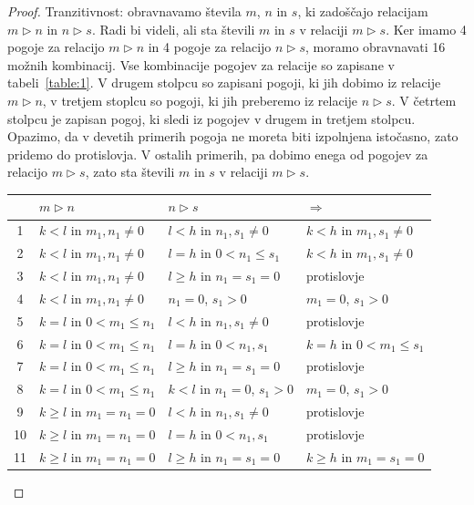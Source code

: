 \documentclass[mat2]{fmfdelo}
\begin{document}
\begin{proof}
Tranzitivnost: obravnavamo števila $m$,  $n$ in $s$, ki zadoščajo relacijam $m \triangleright n$ in $n \triangleright s$. Radi bi videli, ali sta števili $m$ in $s$ v relaciji $m \triangleright s$. Ker imamo 4 pogoje za relacijo $m \triangleright n$ in 4 pogoje za relacijo $n \triangleright s$, moramo obravnavati 16 možnih kombinacij. Vse kombinacije pogojev za relacije so zapisane v tabeli~\ref{table:1}. V drugem stolpcu so zapisani pogoji, ki jih dobimo iz relacije $m \triangleright n$, v tretjem stoplcu so pogoji, ki jih preberemo iz relacije $n \triangleright s$. V četrtem stolpcu je zapisan pogoj, ki sledi iz pogojev v drugem in tretjem stolpcu. Opazimo, da v devetih primerih pogoja ne moreta biti izpolnjena istočasno, zato pridemo do protislovja. V ostalih primerih, pa dobimo enega od pogojev za relacijo $m \triangleright s$, zato sta števili $m$ in $s$ v relaciji $m \triangleright s$.
\renewcommand{\arraystretch}{1.2}
\begin{table}[h!]
\centering
\begin{tabular}{||c | l | l | l||} 
 \hline
  & $m \triangleright n$ & $n \triangleright s$ & $\Rightarrow$ \\ [0.5ex] 
 \hline\hline
 1 & $k<l$ in $m_1, n_1 \neq 0$ & $l<h$ in $n_1, s_1 \neq 0$ & $k<h$ in $m_1, s_1 \neq 0$ \\ 
 2 & $k<l$ in $m_1, n_1 \neq 0$ & $l=h$ in $0<n_1 \leq s_1$ & $k<h$ in $m_1, s_1 \neq 0$ \\
 3 & $k<l$ in $m_1, n_1 \neq 0$ & $l \geq h$ in $n_1 = s_1 = 0$ & protislovje \\
 4 & $k<l$ in $m_1, n_1 \neq 0$ & $n_1 = 0$, $s_1 > 0$ & $m_1 = 0$, $s_1 > 0$ \\
 5 & $k=l$ in $0<m_1 \leq n_1$ & $l<h$ in $n_1, s_1 \neq 0$ & protislovje \\ 
 6 & $k=l$ in $0<m_1 \leq n_1$ & $l=h$ in $0<n_1, s_1$ & $k=h$ in $0<m_1 \leq s_1$ \\
 7 & $k=l$ in $0<m_1 \leq n_1$ & $l \geq h$ in $n_1 = s_1 = 0$ & protislovje \\
 8 & $k=l$ in $0<m_1 \leq n_1$ & $k<l$ in $n_1 = 0$, $s_1 > 0$ & $m_1 = 0$, $s_1 > 0$ \\
 9 & $k \geq l$ in $m_1 = n_1 = 0$ & $l<h$ in $n_1, s_1 \neq 0$ & protislovje \\ 
 10 & $k \geq l$ in $m_1 = n_1 = 0$ & $l=h$ in $0<n_1, s_1$ & protislovje \\
 11 & $k \geq l$ in $m_1 = n_1 = 0$ & $l \geq h$ in $n_1 = s_1 = 0$ & $k \geq h$ in $m_1 = s_1 = 0$ \\

\end{tabular}
\end{table}
\end{proof}
\end{document}
